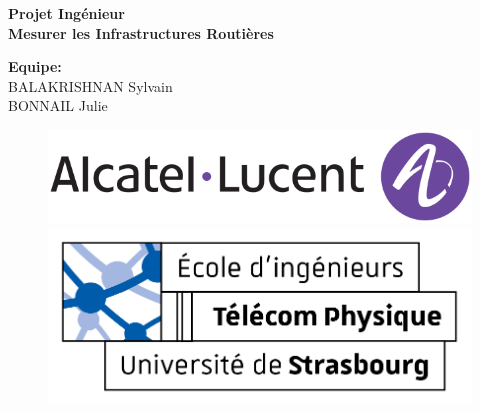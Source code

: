 \documentclass{article}
\begin{document}
\thispagestyle{empty}
\addtocounter{page}{-1}
\begin{center}
    \baselineskip=50pt
    \vspace*{1cm}
    \textbf{{\Huge Projet Ingénieur}}\\
    \vspace*{0.25cm}
    \textbf{{\Huge Mesurer les Infrastructures Routières}}\\
    \vspace*{0.25cm}
    \begin{minipage}[c]{.46\linewidth}
        \centering
        \textbf{Equipe:}\\
        BALAKRISHNAN Sylvain\\BONNAIL Julie
    \end{minipage}
\end{center}
\vspace*{0.1cm}

\begin{figure}[H]
    \centering
    \centerline{\includegraphics[scale=.66]{img/logo_Alcatel_1.png}}
    \vspace*{0.1cm}
    \centerline{\includegraphics[scale=1.25]{img/logo_TPS_2.png}}
\end{figure}

\newpage
\renewcommand{\contentsname}{Table des matières}
\tableofcontents

\newpage
{}
\renewcommand{\listfigurename}{Liste des figures}
\listoffigures

\newpage
\vspace*{0.01cm}

















\newpage
\vspace*{0.01cm}
\renewcommand{\refname}{Bibliographie}


\end{document}
